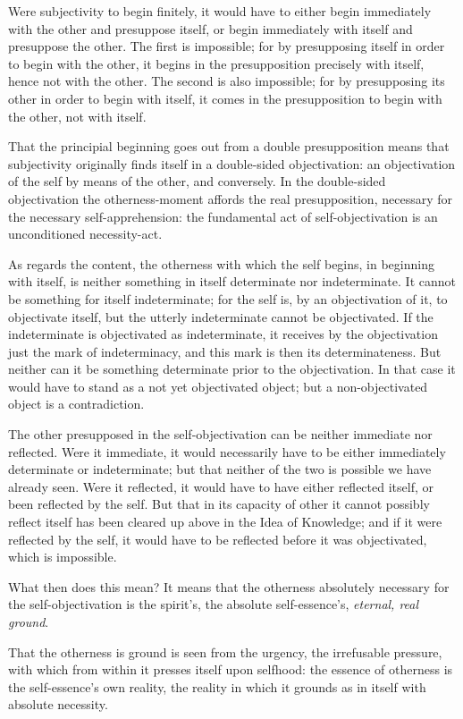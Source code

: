 \documentclass[12pt]{book}
\begin{document}
Were subjectivity to begin finitely, it would have to either begin
immediately with the other and presuppose itself, or begin
immediately with itself and presuppose the other. The first is
impossible; for by presupposing itself in order to begin with the
other, it begins in the presupposition precisely with itself, hence
not with the other. The second is also impossible; for by
presupposing its other in order to begin with itself, it comes in
the presupposition to begin with the other, not with itself.

That the principial beginning goes out from a double presupposition
means that subjectivity originally finds itself in a double-sided
objectivation: an objectivation of the self by means of the other,
and conversely. In the double-sided objectivation the
otherness-moment affords the real presupposition, necessary for the
necessary self-apprehension: the fundamental act of
self-objectivation is an unconditioned necessity-act.

As regards the content, the otherness with which the self begins, in
beginning with itself, is neither something in itself determinate
nor indeterminate. It cannot be something for itself indeterminate;
for the self is, by an objectivation of it, to objectivate itself,
but the utterly indeterminate cannot be objectivated. If the
indeterminate is objectivated as indeterminate, it receives by the
objectivation just the mark of indeterminacy, and this mark is then
its determinateness. But neither can it be something determinate
prior to the objectivation. In that case it would have to stand as a
not yet objectivated object; but a non-objectivated object is a
contradiction.

The other presupposed in the self-objectivation can be neither
immediate nor reflected. Were it immediate, it would necessarily
have to be either immediately determinate or indeterminate; but that
neither of the two is possible we have already seen. Were it
reflected, it would have to have either reflected itself, or been
reflected by the self. But that in its capacity of other it cannot
possibly reflect itself has been cleared up above in the Idea of
Knowledge; and if it were reflected by the self, it would have to be
reflected before it was objectivated, which is impossible.

What then does this mean? It means that the otherness absolutely
necessary for the self-objectivation is the spirit's, the absolute
self-essence's, \emph{eternal, real ground}.

That the otherness is ground is seen from the urgency, the
irrefusable pressure, with which from within it presses itself upon
selfhood: the essence of otherness is the self-essence's own
reality,
the reality in which it grounds as in itself with absolute
necessity.
\end{document}
